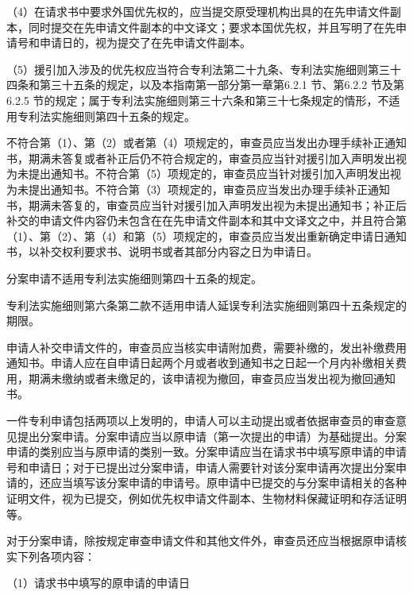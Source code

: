 （4）在请求书中要求外国优先权的，应当提交原受理机构出具的在先申请文件副本，同时提交在先申请文件副本的中文译文；要求本国优先权，并且写明了在先申请号和申请日的，视为提交了在先申请文件副本。

（5）援引加入涉及的优先权应当符合专利法第二十九条、专利法实施细则第三十四条和第三十五条的规定，以及本指南第一部分第一章第6.2.1 节、第6.2.2 节及第6.2.5 节的规定；属于专利法实施细则第三十六条和第三十七条规定的情形，不适用专利法实施细则第四十五条的规定。

不符合第（1）、第（2）或者第（4）项规定的，审查员应当发出办理手续补正通知书，期满未答复或者补正后仍不符合规定的，审查员应当针对援引加入声明发出视为未提出通知书。不符合第（5）项规定的，审查员应当针对援引加入声明发出视为未提出通知书。不符合第（3）项规定的，审查员应当发出办理手续补正通知书，期满未答复的，审查员应当针对援引加入声明发出视为未提出通知书；补正后补交的申请文件内容仍未包含在在先申请文件副本和其中文译文之中，并且符合第（1）、第（2）、第（4）和第（5）项规定的，审查员应当发出重新确定申请日通知书，以补交权利要求书、说明书或者其部分内容之日为申请日。

分案申请不适用专利法实施细则第四十五条的规定。

专利法实施细则第六条第二款不适用申请人延误专利法实施细则第四十五条规定的期限。

申请人补交申请文件的，审查员应当核实申请附加费，需要补缴的，发出补缴费用通知书。申请人应在自申请日起两个月或者收到通知书之日起一个月内补缴相关费用，期满未缴纳或者未缴足的，该申请视为撤回，审查员应当发出视为撤回通知书。

一件专利申请包括两项以上发明的，申请人可以主动提出或者依据审查员的审查意见提出分案申请。分案申请应当以原申请（第一次提出的申请）为基础提出。分案申请的类别应当与原申请的类别一致。分案申请应当在请求书中填写原申请的申请号和申请日；对于已提出过分案申请，申请人需要针对该分案申请再次提出分案申请的，还应当填写该分案申请的申请号。原申请中已提交的与分案申请相关的各种证明文件，视为已提交，例如优先权申请文件副本、生物材料保藏证明和存活证明等。

对于分案申请，除按规定审查申请文件和其他文件外，审查员还应当根据原申请核实下列各项内容：

{\setlength{\parindent}{17.1bp}（1）请求书中填写的原申请的申请日\par}

